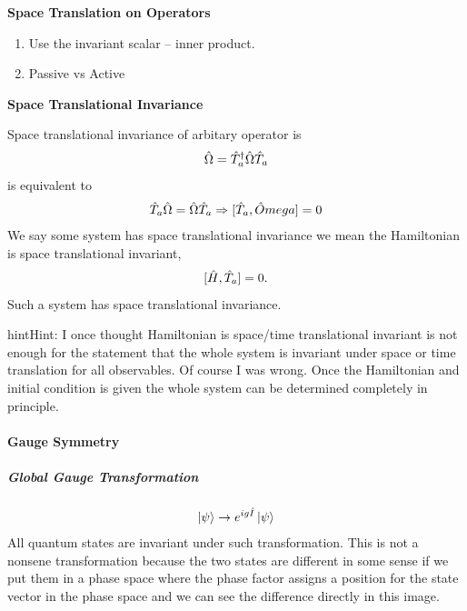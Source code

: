 \documentclass[letterpaper,10pt,english]{sphinxmanual}
\newcommand{\ket}[1]{\left| #1\right\rangle}
\begin{document}
\textbf{Space Translation on Operators}
\begin{enumerate}
\item {} 
Use the invariant scalar -- inner product.

\item {} 
Passive vs Active

\end{enumerate}

\textbf{Space Translational Invariance}

Space translational invariance of arbitary operator is
\begin{gather}
\begin{split}\hat \Omega = \hat T_a^\dagger \hat \Omega \hat T_a\end{split}\notag
\end{gather}
is equivalent to
\begin{gather}
\begin{split}\hat T_a \hat \Omega = \hat \Omega \hat T_a \Rightarrow [\hat T_a, \hat Omega] = 0\end{split}\notag
\end{gather}
We say some system has space translational invariance we mean the Hamiltonian is space translational invariant,
\begin{gather}
\begin{split}[\hat H , \hat T_a ] = 0 .\end{split}\notag
\end{gather}
Such a system has space translational invariance.

\begin{notice}{hint}{Hint:}
I once thought Hamiltonian is space/time translational invariant is not enough for the statement that the whole system is invariant under space or time translation for all observables. Of course I was wrong. Once the Hamiltonian and initial condition is given the whole system can be determined completely in principle.
\end{notice}


\paragraph{Gauge Symmetry}
\label{Quantum/symmetries:gauge-symmetry}

\subparagraph{Global Gauge Transformation}
\label{Quantum/symmetries:global-gauge-transformation}\begin{gather}
\begin{split}\ket{\psi} \rightarrow e^{i g \hat I} \ket{\psi}\end{split}\notag
\end{gather}
All quantum states are invariant under such transformation. This is not a nonsene transformation because the two states are different in some sense if we put them in a phase space where the phase factor assigns a position for the state vector in the phase space and we can see the difference directly in this image.
\end{document}
